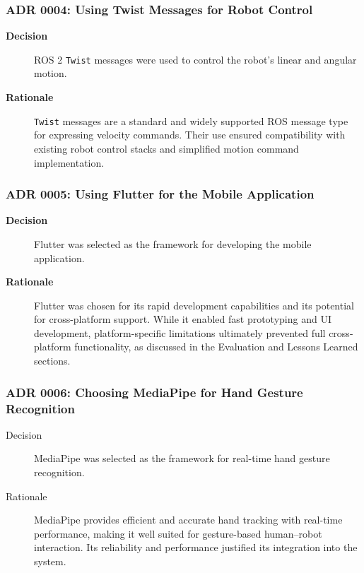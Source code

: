 \documentclass[11pt,a4paper]{article}
\begin{document}
\subsubsection{ADR 0004: Using Twist Messages for Robot Control}

\begin{description}
	\item[\textbf{Decision}] ROS 2 \texttt{Twist} messages were used to control the robot’s linear and angular motion.
	\item[\textbf{Rationale}] \texttt{Twist} messages are a standard and widely supported ROS message type for expressing velocity commands. Their use ensured compatibility with existing robot control stacks and simplified motion command implementation.
\end{description}

\subsubsection*{ADR 0005: Using Flutter for the Mobile Application}

\begin{description}
	\item[\textbf{Decision}] Flutter was selected as the framework for developing the mobile application.
	\item[\textbf{Rationale}] Flutter was chosen for its rapid development capabilities and its potential for cross-platform support. While it enabled fast prototyping and UI development, platform-specific limitations ultimately prevented full cross-platform functionality, as discussed in the Evaluation and Lessons Learned sections.
\end{description}

\subsubsection{ADR 0006: Choosing MediaPipe for Hand Gesture Recognition}

\begin{description}
	\item[Decision] MediaPipe was selected as the framework for real-time hand gesture recognition.
	\item[Rationale] MediaPipe provides efficient and accurate hand tracking with real-time performance, making it well suited for gesture-based human--robot interaction. Its reliability and performance justified its integration into the system.
\end{description}
\end{document}
